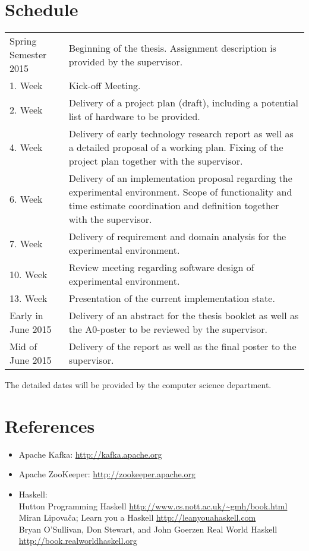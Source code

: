 \section*{Schedule}
\begin{table}[H]
\begin{tabular}{|l|p{10cm}|}
\cline{1-2}
{Spring Semester 2015}     & {Beginning of the thesis. Assignment
description is provided by the supervisor.} 
\\ \cline{1-2}

1. Week  & Kick-off Meeting.
  \\ \cline{1-2}
2. Week & Delivery of a project plan (draft), including a potential list of
  hardware to be provided.
  \\ \cline{1-2}
4. Week  & Delivery of early technology research
  report as well as a detailed proposal of a working plan. Fixing of the
project plan together with the supervisor. \\
\cline{1-2}
6. Week  & Delivery of an implementation proposal
regarding the experimental environment. Scope of functionality and time estimate
coordination and definition together with the supervisor.              \\
\cline{1-2}
7. Week  & Delivery of requirement and domain analysis for the experimental
environment.
  \\ \cline{1-2}
10. Week & Review meeting regarding software design of experimental environment.
  \\ \cline{1-2}
13. Week & Presentation of the current implementation state.
  \\ \cline{1-2}
Early in June 2015  & Delivery of an abstract for the
  thesis booklet as well as the A0-poster to be reviewed by the supervisor. \\
\cline{1-2}
Mid of June 2015   & Delivery of the report as well as the final poster to the
supervisor.
  \\ \cline{1-2}
\end{tabular}
\end{table}

The detailed dates will be provided by the computer science department.

\section*{References}
\begin{itemize}
    \item [1] Apache Kafka: \url{http://kafka.apache.org}
    \item [2] Apache ZooKeeper: \url{http://zookeeper.apache.org}
    \item [3] Haskell: \\
           Hutton Programming Haskell
           \url{http://www.cs.nott.ac.uk/~gmh/book.html}\\
            Miran Lipovača; Learn you a Haskell
            \url{http://leanyouahaskell.com} \\
            Bryan O'Sullivan, Don Stewart, and John Goerzen  Real World Haskell 
            \url{http://book.realworldhaskell.org}
\end{itemize}

